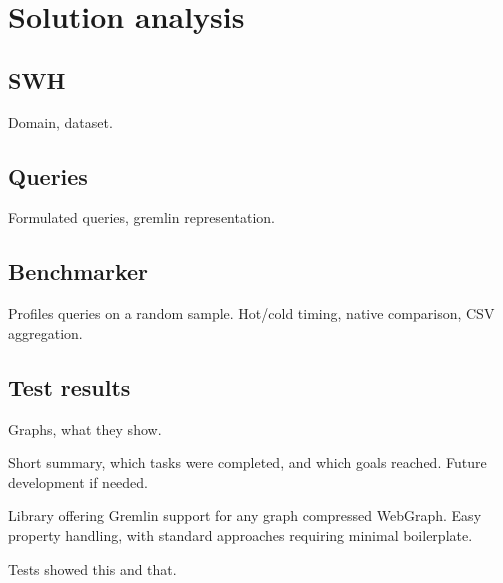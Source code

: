 \documentclass[times,specification,annotation,languages={russian,english}]{itmo-student-thesis}
\begin{document}
\chapter{Solution analysis}

\section{SWH}
Domain, dataset.

\section{Queries}
Formulated queries, gremlin representation.

\section{Benchmarker}
Profiles queries on a random sample. Hot/cold timing, native comparison, CSV aggregation.

\section{Test results}
Graphs, what they show.

\startconclusionpage
Short summary, which tasks were completed, and which goals reached. Future development if needed.

Library offering Gremlin support for any graph compressed WebGraph. Easy property handling, with standard approaches requiring minimal boilerplate.

Tests showed this and that.
\end{document}
